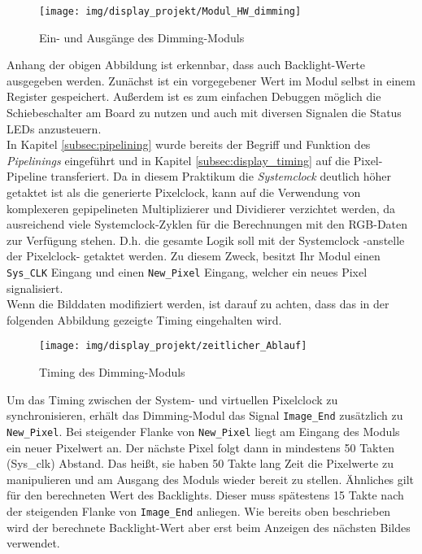 \begin{figure}[H]
\centering
\texttt{[image: img/display\_projekt/Modul\_HW\_dimming]}
\caption{Ein- und Ausgänge des Dimming-Moduls}
\label{fig:dimming_modul_portliste}
\end{figure}
Anhang der obigen Abbildung ist erkennbar, dass auch Backlight-Werte ausgegeben werden. Zunächst ist ein vorgegebener Wert im Modul selbst in einem Register gespeichert. Außerdem ist es zum einfachen Debuggen möglich die Schiebeschalter am Board zu nutzen und auch mit diversen Signalen die Status LEDs anzusteuern.\\
In Kapitel \ref{subsec:pipelining} wurde bereits der Begriff und Funktion des \emph{Pipelinings} eingeführt und in Kapitel \ref{subsec:display_timing} auf die Pixel-Pipeline transferiert. Da in diesem Praktikum die \emph{Systemclock} deutlich höher getaktet ist als die generierte Pixelclock, kann auf die Verwendung von komplexeren gepipelineten Multiplizierer und Dividierer verzichtet werden, da ausreichend viele Systemclock-Zyklen für die Berechnungen mit den RGB-Daten zur Verfügung stehen. D.h. die gesamte Logik soll mit der Systemclock -anstelle der Pixelclock- getaktet werden. Zu diesem Zweck, besitzt Ihr Modul einen \texttt{Sys\_CLK} Eingang und einen \texttt{New\_Pixel} Eingang, welcher ein neues Pixel signalisiert.\\
Wenn die Bilddaten modifiziert werden, ist darauf zu achten, dass das in der folgenden Abbildung gezeigte Timing eingehalten wird.
\begin{figure}[H]
\centering
\texttt{[image: img/display\_projekt/zeitlicher\_Ablauf]}
\caption{Timing des Dimming-Moduls}
\label{fig:Timing_Dimming_Modul}
\end{figure}
Um das Timing zwischen der System- und virtuellen Pixelclock zu synchronisieren, erhält das Dimming-Modul das Signal \texttt{Image\_End} zusätzlich zu \texttt{New\_Pixel}. Bei steigender Flanke von \texttt{New\_Pixel} liegt am Eingang des Moduls ein neuer Pixelwert an. Der nächste Pixel folgt dann in mindestens 50 Takten (Sys\_clk) Abstand. Das heißt, sie haben 50 Takte lang Zeit die Pixelwerte zu manipulieren und am Ausgang des Moduls wieder bereit zu stellen. 
Ähnliches gilt für den berechneten Wert des Backlights. Dieser muss spätestens 15 Takte nach der steigenden Flanke von \texttt{Image\_End} anliegen. Wie bereits oben beschrieben wird der berechnete Backlight-Wert aber erst beim Anzeigen des nächsten Bildes verwendet. 

